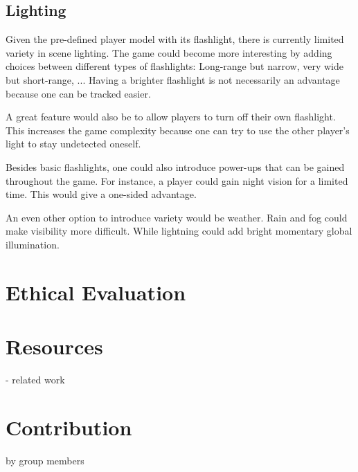 \documentclass[11pt]{article}
\begin{document}
\subsection{Lighting}
\par Given the pre-defined player model with its flashlight, there is currently limited variety in scene lighting. The game could become more interesting by adding choices between different types of flashlights: Long-range but narrow, very wide but short-range, ... Having a brighter flashlight is not necessarily an advantage because one can be tracked easier.
\par A great feature would also be to allow players to turn off their own flashlight. This increases the game complexity because one can try to use the other player's light to stay undetected oneself.
\par Besides basic flashlights, one could also introduce power-ups that can be gained throughout the game. For instance, a player could gain night vision for a limited time. This would give a one-sided advantage.
\par An even other option to introduce variety would be weather. Rain and fog could make visibility more difficult. While lightning could add bright momentary global illumination.





\section{Ethical Evaluation}





\section{Resources}
- related work





\section{Contribution}
by group members
\end{document}
